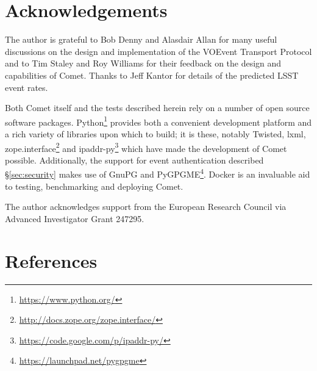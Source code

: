 \documentclass[5p,authoryear]{elsarticle}
\begin{document}
\section{Acknowledgements}
\label{sec:ack}

The author is grateful to Bob Denny and Alasdair Allan for many useful
discussions on the design and implementation of the VOEvent Transport Protocol
and to Tim Staley and Roy Williams for their feedback on the design and
capabilities of Comet. Thanks to Jeff Kantor for details of the predicted LSST
event rates.

Both Comet itself and the tests described herein rely on a number of open
source software packages.  Python\footnote{\url{https://www.python.org/}}
provides both a convenient development platform and a rich variety of
libraries upon which to build; it is these, notably Twisted, lxml,
zope.interface\footnote{\url{http://docs.zope.org/zope.interface/}} and
ipaddr-py\footnote{\url{https://code.google.com/p/ipaddr-py/}} which have made
the development of Comet possible. Additionally, the support for event
authentication described \S\ref{sec:security} makes use of GnuPG and
PyGPGME\footnote{\url{https://launchpad.net/pygpgme}}. Docker is an invaluable
aid to testing, benchmarking and deploying Comet.

The author acknowledges support from the European Research Council via
Advanced Investigator Grant 247295.

\section*{References}



\end{document}

